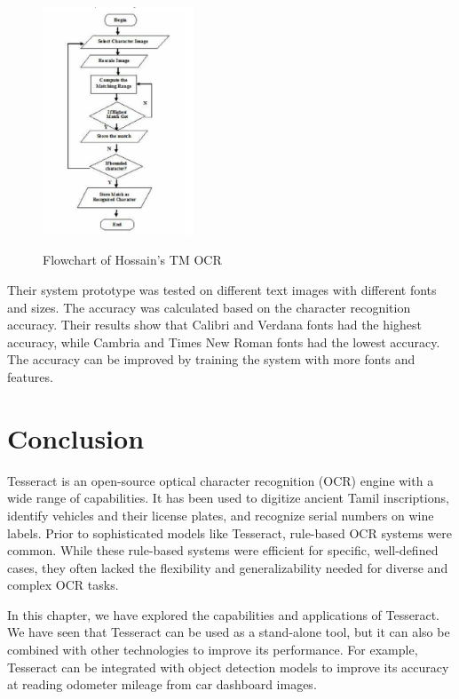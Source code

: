\begin{figure}[ht]
    \centering
    \includegraphics[width=0.4\textwidth]{Figures/TM_Hossain.jpg}
    \caption[Flowchart of Template Matching OCR]{Flowchart of Hossain's TM OCR}\cite{hossainOpticalCharacterRecognition2019}
    \label{fig:Hossain OCR Template Matching Paper}
\end{figure}

Their system prototype was tested on different text images with different fonts and sizes. The accuracy was calculated based on the character recognition accuracy. Their results show that Calibri and Verdana fonts had the highest accuracy, while Cambria and Times New Roman fonts had the lowest accuracy.  The accuracy can be improved by training the system with more fonts and features. \cite{hossainOpticalCharacterRecognition2019}

\newpage
\section{Conclusion}

Tesseract is an open-source optical character recognition (OCR) engine with a wide range of capabilities. It has been used to digitize ancient Tamil inscriptions, identify vehicles and their license plates, and recognize serial numbers on wine labels. Prior to sophisticated models like Tesseract, rule-based OCR systems were common. While these rule-based systems were efficient for specific, well-defined cases, they often lacked the flexibility and generalizability needed for diverse and complex OCR tasks.

In this chapter, we have explored the capabilities and applications of Tesseract. We have seen that Tesseract can be used as a stand-alone tool, but it can also be combined with other technologies to improve its performance. For example, Tesseract can be integrated with object detection models to improve its accuracy at reading odometer mileage from car dashboard images.


